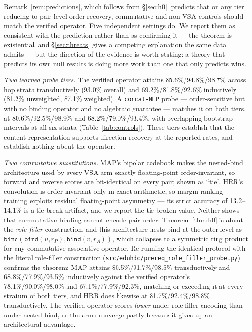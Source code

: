 \documentclass[10pt]{article}
\begin{document}
Remark~\ref{rem:predictions}, which follows from \S\ref{sec:h0}, predicts that on any tier reducing to pair-level order recovery, commutative and non-VSA controls should match the verified operator. Five independent settings do. We report them as consistent with the prediction rather than as confirming it --- the theorem is existential, and \S\ref{sec:threats} gives a competing explanation the same data admits --- but the direction of the evidence is worth stating: a theory that predicts its own null results is doing more work than one that only predicts wins.

\emph{Two learned probe tiers.} The verified operator attains 85.6\%/94.8\%/98.7\% across hop strata transductively (93.0\% overall) and 69.2\%/81.8\%/92.6\% inductively (81.2\% unweighted, 87.1\% weighted). A \texttt{concat-MLP} probe --- order-sensitive but with no binding operator and no algebraic guarantee --- matches it on both tiers, at 80.6\%/92.5\%/98.9\% and 68.2\%/79.0\%/93.4\%, with overlapping bootstrap intervals at all six strata (Table~\ref{tab:controls}). These tiers establish that the content representation supports direction recovery at the reported rates, and establish nothing about the operator.

\emph{Two commutative substitutions.} MAP's bipolar codebook makes the nested-bind architecture used by every VSA arm exactly floating-point order-invariant, so forward and reverse scores are bit-identical on every pair; shown as ``tie''. HRR's convolution is order-invariant only in exact arithmetic, so margin-ranking training exploits residual floating-point asymmetry --- its strict accuracy of 13.2--14.1\% is a tie-break artifact, and we report the tie-broken value. Neither shows that commutative binding cannot encode pair order: Theorem~\ref{thm:h0} is about the \emph{role-filler} construction, and this architecture nests bind at the outer level as $\texttt{bind}(\texttt{bind}(u, r_P), \texttt{bind}(v, r_A))$, which collapses to a symmetric ring product for any commutative associative operator. Re-running the identical protocol with the literal role-filler construction (\texttt{src/eduhdc/\allowbreak prereq\_role\_filler\_probe.py}) confirms the theorem: MAP attains 80.5\%/91.7\%/98.5\% transductively and 68.8\%/77.9\%/93.5\% inductively against the verified operator's 78.1\%/90.0\%/98.0\% and 67.1\%/77.9\%/92.3\%, matching or exceeding it at every stratum of both tiers, and HRR does likewise at 81.7\%/92.4\%/98.8\% transductively. The verified operator scores \emph{lower} under role-filler encoding than under nested bind, so the arms converge partly because it gives up an architectural advantage.
\end{document}
